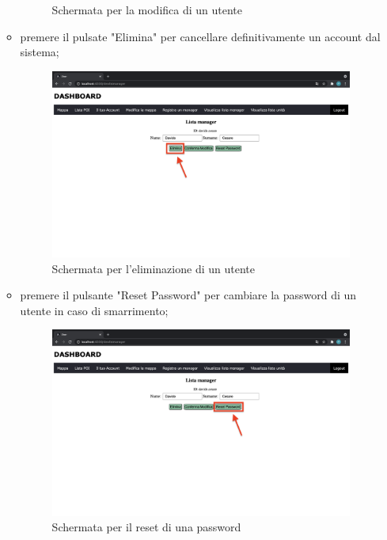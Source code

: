 \begin{itemize}
\begin{itemize}
\begin{figure}[H]
                \caption{Schermata per la modifica di un utente}
            \end{figure}
            \item premere il pulsate "Elimina" per cancellare definitivamente un account dal sistema;
            \begin{figure}[H]
                \centering
                \includegraphics[scale=0.12]{res/images/eliminamanager.png}
                \caption{Schermata per l'eliminazione di un utente}
            \end{figure}
            \item premere il pulsante "Reset Password" per cambiare la password di un utente in caso di smarrimento; 
            \begin{figure}[H]
                \centering
                \includegraphics[scale=0.12]{res/images/resetpassword1.png}
                \caption{Schermata per il reset di una password}
            \end{figure}

\end{itemize}
\end{itemize}
